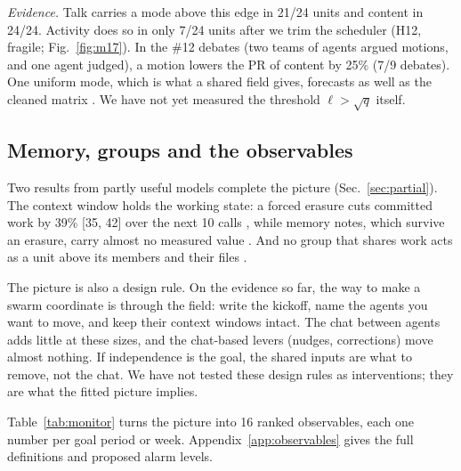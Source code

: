\emph{Evidence.} Talk carries a mode above this edge in 21/24 units and content in 24/24. Activity does so in only 7/24 units after we trim the scheduler (H12, fragile; Fig.~\ref{fig:m17}). In the \#12 debates (two teams of agents argued motions, and one agent judged), a motion lowers the PR of content by 25\% (7/9 debates). One uniform mode, which is what a shared field gives, forecasts as well as the cleaned matrix . We have not yet measured the threshold $\ell>\sqrt q$ itself.

\subsection{Memory, groups and the observables}\label{sec:observables}

Two results from partly useful models complete the picture (Sec.~\ref{sec:partial}). The context window holds the working state: a forced erasure cuts committed work by 39\% [35, 42] over the next 10 calls , while memory notes, which survive an erasure, carry almost no measured value . And no group that shares work acts as a unit above its members and their files .

The picture is also a design rule. On the evidence so far, the way to make a swarm coordinate is through the field: write the kickoff, name the agents you want to move, and keep their context windows intact. The chat between agents adds little at these sizes, and the chat-based levers (nudges, corrections) move almost nothing. If independence is the goal, the shared inputs are what to remove, not the chat. We have not tested these design rules as interventions; they are what the fitted picture implies.

Table~\ref{tab:monitor} turns the picture into 16 ranked observables, each one number per goal period or week. Appendix~\ref{app:observables} gives the full definitions and proposed alarm levels.

